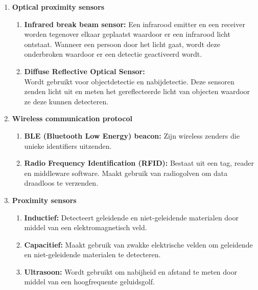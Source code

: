 {\begin{enumerate}
    \item \textbf{Optical proximity sensors}
    \begin{enumerate}
        \item \textbf{Infrared break beam sensor:} Een infrarood emitter en een receiver worden tegenover elkaar geplaatst waardoor er een infrarood licht ontstaat. Wanneer een persoon door het licht gaat, wordt deze onderbroken waardoor er een detectie geactiveerd wordt.
        \item \textbf{Diffuse Reflective Optical Sensor:} \\ Wordt gebruikt voor objectdetectie en nabijdetectie. Deze sensoren zenden licht uit en meten het gereflecteerde licht van objecten waardoor ze deze kunnen detecteren.
    \end{enumerate}
    
    \item \textbf{Wireless communication protocol}
    \begin{enumerate}
        \item \textbf{BLE (Bluetooth Low Energy) beacon:} Zijn wireless zenders die unieke identifiers uitzenden.
        \item \textbf{Radio Frequency Identification (RFID):} Bestaat uit een tag, reader en middleware software. Maakt gebruik van radiogolven om data draadloos te verzenden.
    \end{enumerate}
    
    
    \item \textbf{Proximity sensors}
    \begin{enumerate}
        \item \textbf{Inductief:} Detecteert geleidende en niet-geleidende materialen door middel van een elektromagnetisch veld.
        \item \textbf{Capacitief:} Maakt gebruik van zwakke elektrische velden om geleidende en niet-geleidende materialen te detecteren.
        \item \textbf{Ultrasoon:} Wordt gebruikt om nabijheid en afstand te meten door middel van een hoogfrequente geluidsgolf.
    \end{enumerate}
    

\end{enumerate}}
